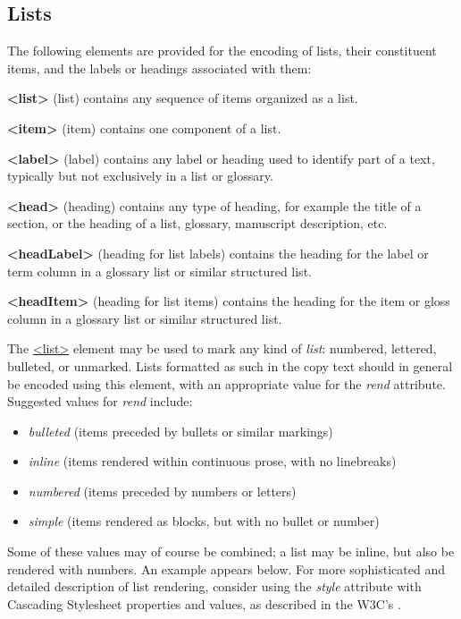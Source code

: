 \subsection[{Lists}]{Lists}\label{COLI}\par
The following elements are provided for the encoding of lists, their constituent items, and the labels or headings associated with them: 
\begin{sansreflist}
  
\item [\textbf{<list>}] (list) contains any sequence of items organized as a list.
\item [\textbf{<item>}] (item) contains one component of a list.
\item [\textbf{<label>}] (label) contains any label or heading used to identify part of a text, typically but not exclusively in a list or glossary.
\item [\textbf{<head>}] (heading) contains any type of heading, for example the title of a section, or the heading of a list, glossary, manuscript description, etc.
\item [\textbf{<headLabel>}] (heading for list labels) contains the heading for the label or term column in a glossary list or similar structured list.
\item [\textbf{<headItem>}] (heading for list items) contains the heading for the item or gloss column in a glossary list or similar structured list.
\end{sansreflist}
\par
The \hyperref[TEI.list]{<list>} element may be used to mark any kind of \textit{list}: numbered, lettered, bulleted, or unmarked. Lists formatted as such in the copy text should in general be encoded using this element, with an appropriate value for the {\itshape rend} attribute. Suggested values for {\itshape rend} include: \begin{itemize}
\item \textit{bulleted} (items preceded by bullets or similar markings)
\item \textit{inline} (items rendered within continuous prose, with no linebreaks)
\item \textit{numbered} (items preceded by numbers or letters)
\item \textit{simple} (items rendered as blocks, but with no bullet or number)
\end{itemize}  Some of these values may of course be combined; a list may be inline, but also be rendered with numbers. An example appears below. For more sophisticated and detailed description of list rendering, consider using the {\itshape style} attribute with Cascading Stylesheet properties and values, as described in the W3C's .\par
